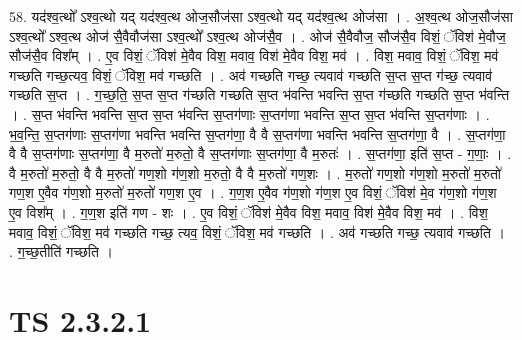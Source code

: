 \documentclass[17pt]{extarticle}
\begin{document}
58. यद॑श्व॒त्थो᳚ ऽश्व॒त्थो यद् यद॑श्व॒त्थ ओज॒सौज॑सा ऽश्व॒त्थो यद् यद॑श्व॒त्थ ओज॑सा । . अ॒श्व॒त्थ ओज॒सौज॑सा ऽश्व॒त्थो᳚ ऽश्व॒त्थ ओज॑ सै॒वैवौज॑सा ऽश्व॒त्थो᳚ ऽश्व॒त्थ ओज॑सै॒व । . ओज॑ सै॒वैवौज॒ सौज॑सै॒व विशं॒ ॅविश॑ मे॒वौज॒ सौज॑सै॒व विश᳚म् । . ए॒व विशं॒ ॅविश॑ मे॒वैव विश॒ मवाव॒ विश॑ मे॒वैव विश॒ मव॑ । . विश॒ मवाव॒ विशं॒ ॅविश॒ मव॑ गच्छति गच्छ॒त्यव॒ विशं॒ ॅविश॒ मव॑ गच्छति । . अव॑ गच्छति गच्छ॒ त्यवाव॑ गच्छति स॒प्त स॒प्त ग॑च्छ॒ त्यवाव॑ गच्छति स॒प्त । . ग॒च्छ॒ति॒ स॒प्त स॒प्त ग॑च्छति गच्छति स॒प्त भ॑वन्ति भवन्ति स॒प्त ग॑च्छति गच्छति स॒प्त भ॑वन्ति । . स॒प्त भ॑वन्ति भवन्ति स॒प्त स॒प्त भ॑वन्ति स॒प्तग॑णाः स॒प्तग॑णा भवन्ति स॒प्त स॒प्त भ॑वन्ति स॒प्तग॑णाः । . भ॒व॒न्ति॒ स॒प्तग॑णाः स॒प्तग॑णा भवन्ति भवन्ति स॒प्तग॑णा॒ वै वै स॒प्तग॑णा भवन्ति भवन्ति स॒प्तग॑णा॒ वै । . स॒प्तग॑णा॒ वै वै स॒प्तग॑णाः स॒प्तग॑णा॒ वै म॒रुतो॑ म॒रुतो॒ वै स॒प्तग॑णाः स॒प्तग॑णा॒ वै म॒रुतः॑ । . स॒प्तग॑णा॒ इति॑ स॒प्त - ग॒णाः॒ । . वै म॒रुतो॑ म॒रुतो॒ वै वै म॒रुतो॑ गण॒शो ग॑ण॒शो म॒रुतो॒ वै वै म॒रुतो॑ गण॒शः । . म॒रुतो॑ गण॒शो ग॑ण॒शो म॒रुतो॑ म॒रुतो॑ गण॒श ए॒वैव ग॑ण॒शो म॒रुतो॑ म॒रुतो॑ गण॒श ए॒व । . ग॒ण॒श ए॒वैव ग॑ण॒शो ग॑ण॒श ए॒व विशं॒ ॅविश॑ मे॒व ग॑ण॒शो ग॑ण॒श ए॒व विश᳚म् । . ग॒ण॒श इति॑ गण - शः । . ए॒व विशं॒ ॅविश॑ मे॒वैव विश॒ मवाव॒ विश॑ मे॒वैव विश॒ मव॑ । . विश॒ मवाव॒ विशं॒ ॅविश॒ मव॑ गच्छति गच्छ॒ त्यव॒ विशं॒ ॅविश॒ मव॑ गच्छति । . अव॑ गच्छति गच्छ॒ त्यवाव॑ गच्छति । . ग॒च्छ॒तीति॑ गच्छति । \newline
\pagebreak
{}

\section{ TS 2.3.2.1 }
\end{document}
